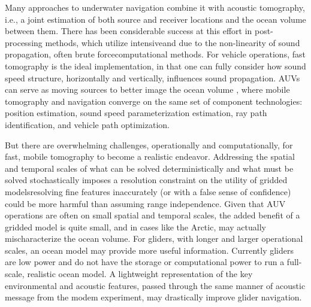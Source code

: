  Many approaches to underwater navigation combine it with acoustic tomography, i.e., a joint estimation of both source and receiver locations and the ocean volume between them.
There has been considerable success at this effort in post-processing methods, which utilize intensive\textemdash and due to the non-linearity of sound propagation, often brute force\textemdash computational methods. 
For vehicle operations, fast tomography is the ideal implementation, in that one can fully consider how sound speed structure, horizontally and vertically, influences sound propagation.
AUVs can serve as moving sources to better image the ocean volume \citep{Deffenbaugh1997,Elisseeff2002}, where mobile tomography and navigation converge on the same set of component technologies: position estimation, sound speed parameterization estimation, ray path identification, and vehicle path optimization.

But there are overwhelming challenges, operationally and computationally, for fast, mobile tomography to become a realistic endeavor.
Addressing the spatial and temporal scales of what can be solved deterministically and what must be solved stochastically imposes a resolution constraint on the utility of gridded models\textemdash resolving fine features inaccurately (or with a false sense of confidence) could be more harmful than assuming range independence.
Given that AUV operations are often on small spatial and temporal scales, the added benefit of a gridded model is quite small, and in cases like the Arctic, may actually mischaracterize the ocean volume. 
For gliders, with longer and larger operational scales, an ocean model may provide more useful information.
Currently gliders are low power and do not have the storage or computational power to run a full-scale, realistic ocean model.
A lightweight representation of the key environmental and acoustic features, passed through the same manner of acoustic message from the modem experiment, may drastically improve glider navigation.



